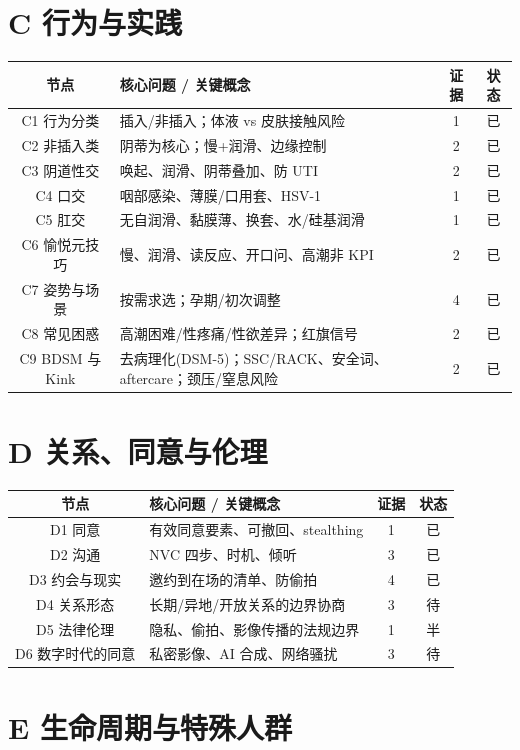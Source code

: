 \documentclass[12pt,UTF8,openany]{ctexbook}
\begin{document}
\section{C 行为与实践}

\begin{tabularx}{\linewidth}{C X c c}
\toprule
\textbf{节点} & \textbf{核心问题 / 关键概念} & \textbf{证据} & \textbf{状态} \\
\midrule
C1 行为分类 & 插入/非插入；体液 vs 皮肤接触风险 & 1 & 已 \\
C2 非插入类 & 阴蒂为核心；慢+润滑、边缘控制 & 2 & 已 \\
C3 阴道性交 & 唤起、润滑、阴蒂叠加、防 UTI & 2 & 已 \\
C4 口交 & 咽部感染、薄膜/口用套、HSV-1 & 1 & 已 \\
C5 肛交 & 无自润滑、黏膜薄、换套、水/硅基润滑 & 1 & 已 \\
C6 愉悦元技巧 & 慢、润滑、读反应、开口问、高潮非 KPI & 2 & 已 \\
C7 姿势与场景 & 按需求选；孕期/初次调整 & 4 & 已 \\
C8 常见困惑 & 高潮困难/性疼痛/性欲差异；红旗信号 & 2 & 已 \\
C9 BDSM 与 Kink & 去病理化(DSM-5)；SSC/RACK、安全词、aftercare；颈压/窒息风险 & 2 & 已 \\
\bottomrule
\end{tabularx}

\section{D 关系、同意与伦理}

\begin{tabularx}{\linewidth}{C X c c}
\toprule
\textbf{节点} & \textbf{核心问题 / 关键概念} & \textbf{证据} & \textbf{状态} \\
\midrule
D1 同意 & 有效同意要素、可撤回、stealthing & 1 & 已 \\
D2 沟通 & NVC 四步、时机、倾听 & 3 & 已 \\
D3 约会与现实 & 邀约到在场的清单、防偷拍 & 4 & 已 \\
D4 关系形态 & 长期/异地/开放关系的边界协商 & 3 & 待 \\
D5 法律伦理 & 隐私、偷拍、影像传播的法规边界 & 1 & 半 \\
D6 数字时代的同意 & 私密影像、AI 合成、网络骚扰 & 3 & 待 \\
\bottomrule
\end{tabularx}

\section{E 生命周期与特殊人群}
\end{document}
